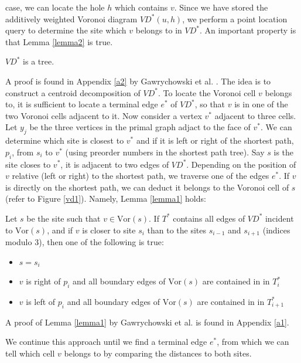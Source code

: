 case, we can locate the hole $h$ which contains $v$. Since we have stored the
additively weighted Voronoi diagram $VD^*(u,h)$, we perform a point location query to
determine the site which $v$ belongs to in $VD^*$. An important property is that Lemma
\ref{lemma2} is true.
\begin{lemma}\label{lemma2}
  $VD^*$ is a tree.
\end{lemma}
A proof is found in Appendix \ref{a2} by Gawrychowski et al.
\cite{gawrychowski2017better}. The idea is to construct a centroid decomposition of $VD^*$. To locate the
Voronoi cell $v$ belongs to, it is sufficient to locate a terminal edge $e^*$ of $VD^*$, so that
$v$ is in one of the two Voronoi cells adjacent to it. Now consider a vertex $v^*$
adjacent to three cells. Let $y_j$ be the three vertices in the primal graph adjact to
the face of $v^*$. We can determine which site is closest to $v^*$ and if it is
left or right of the shortest path, $p_i$, from $s_i$ to $v^*$ (using preorder numbers in the
shortest path tree). Say $s$ is the site closes to $v^*$, it is adjacent to two edges of
$VD^*$. Depending on the position of $v$ relative (left or right) to the shortest path,
we traverse one of the edges $e^*$. If $v$ is directly on the shortest path, we can
deduct it belongs to the Voronoi cell of $s$ (refer to Figure \ref{vd1}). Namely, Lemma
\ref{lemma1} holds:
\begin{lemma}\label{lemma1}
  Let $s$ be the site such that $v\in \text{Vor}(s)$. If $T^*$ contains all edges of
  $VD^*$ incident to $\text{Vor}(s)$, and if $v$ is closer to site $s_i$ than to the
  sites $s_{i-1}$ and $s_{i+1}$ (indices modulo $3$), then one of the following is true:
  \begin{itemize}
    \item $s=s_i$
    \item $v$ is right of $p_i$ and all boundary edges of $\text{Vor}(s)$ are contained
      in in $T_i^*$
    \item $v$ is left of $p_i$ and all boundary edges of $\text{Vor}(s)$ are contained
      in in $T_{i+1}^*$
  \end{itemize}
\end{lemma}
A proof of Lemma \ref{lemma1} by Gawrychowski et al. \cite{gawrychowski2017better} is
found in Appendix \ref{a1}.

We continue this approach until we find a
terminal edge $e^*$, from which we can tell which cell $v$ belongs to by comparing the
distances to both sites.

